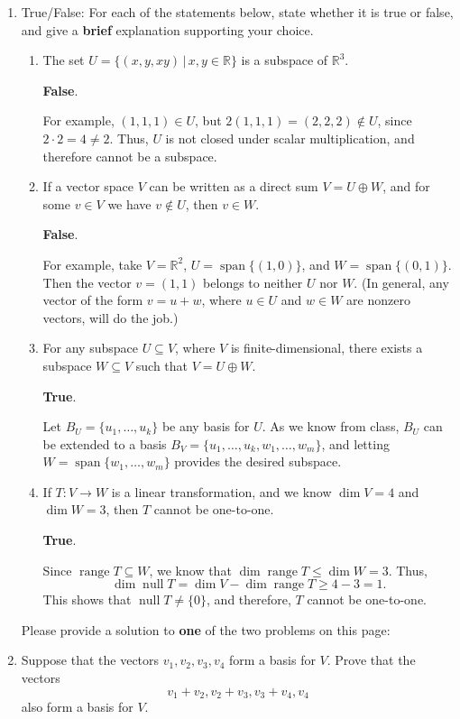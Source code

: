 \documentclass[12pt]{article}
\newcommand{\points}[1]{\marginpar{\hspace{24pt}[#1]}}
\newcommand{\R}{\mathbb{R}}
\DeclareMathOperator{\spn}{span}
\DeclareMathOperator{\nul}{null}
\DeclareMathOperator{\range}{range}
\begin{document}
\begin{enumerate}
\item True/False: For each of the statements below, state whether it is true or false, and give a {\bf brief} explanation supporting your choice.
 \begin{enumerate}
\item The set $U=\{(x,y,xy)\,|\,x,y\in\R\}$ is a subspace of $\R^3$.\points{3}

\bigskip

{\bf False}.

For example, $(1,1,1)\in U$, but $2(1,1,1)=(2,2,2)\notin U$, since $2\cdot 2=4\neq 2$. Thus, $U$ is not closed under scalar multiplication, and therefore cannot be a subspace.

\bigskip

\item If a vector space $V$ can be written as a direct sum $V=U\oplus W$, and for some $v\in V$ we have $v\notin U$, then $v\in W$.\points{3}

\bigskip

{\bf False}.

For example, take $V=\R^2$, $U=\spn\{(1,0)\}$, and $W=\spn\{(0,1)\}$. Then the vector $v=(1,1)$ belongs to neither $U$ nor $W$. (In general, any vector of the form $v=u+w$, where $u\in U$ and $w\in W$ are nonzero vectors, will do the job.)

\bigskip

\item For any subspace $U\subseteq V$, where $V$ is finite-dimensional, there exists a subspace $W\subseteq V$ such that $V=U\oplus W$.\points{3}

\bigskip

{\bf True}.

Let $B_U=\{u_1,\ldots, u_k\}$ be any basis for $U$. As we know from class, $B_U$ can be extended to a basis $B_V = \{u_1,\ldots, u_k,w_1,\ldots, w_m\}$, and letting $W=\spn\{w_1,\ldots, w_m\}$ provides the desired subspace.

\bigskip

\item If $T:V\to W$ is a linear transformation, and we know $\dim V=4$ and $\dim W=3$, then $T$ cannot be one-to-one.\points{3}

\bigskip

{\bf True}.

Since $\range T\subseteq W$, we know that $\dim\range T\leq \dim W=3$. Thus,
\[
 \dim\nul T = \dim V - \dim \range T \geq 4-3=1.
\]
This shows that $\nul T\neq \{0\}$, and therefore, $T$ cannot be one-to-one.
\end{enumerate}
\newpage
Please provide a solution to {\bf one} of the two problems on this page: 
\item Suppose that the vectors $v_1,v_2,v_3,v_4$ form a basis for $V$. Prove that the vectors \points{8}
\[
 v_1+v_2,v_2+v_3,v_3+v_4,v_4
\]
also form a basis for $V$.


\end{enumerate}
\end{document}
